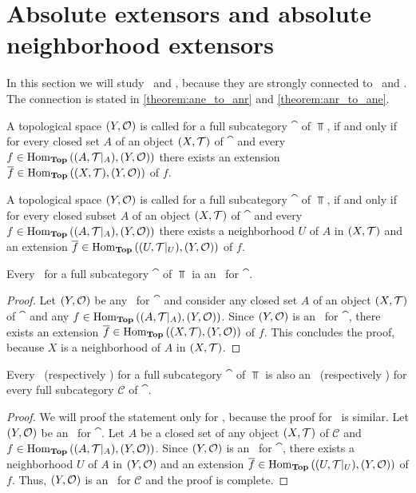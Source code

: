 \chapter{Absolute extensors and absolute neighborhood extensors}

In this section we will study \aexs\ and \anes, because they are strongly connected to \ars\ and \anrs. The connection is stated in \ref{theorem:ane_to_anr} and \ref{theorem:anr_to_ane}. 

\begin{definition}
	A topological space $\tspace[Y][O]$ is called \textit{\aex} for a full subcategory $\cat$ of $\Top$, if and only if for every closed set $A$ of an object $\tspace$ of $\cat$ and every $f \in \Hom_\Top\pbraces{\reltspace, \tspace[Y][O]}$ there exists an extension $\overline{f} \in \Hom_\Top\pbraces{\tspace, \tspace[Y][O]}$ of $f$.  
\end{definition}

\begin{definition}
	A topological space $\tspace[Y][O]$ is called \textit{\ane} for a full subcategory $\cat$ of $\Top$, if and only if for every closed subset $A$ of an object $\tspace$ of $\cat$ and every $f \in \Hom_\Top\pbraces{\reltspace, \tspace[Y][O]}$ there exists a neighborhood $U$ of $A$ in $\tspace$ and an extension $\overline{f} \in \Hom_\Top\pbraces{\reltspace[U], \tspace[Y][O]}$ of $f$.
\end{definition}

\begin{proposition}
	Every \aex\ for a full subcategory $\cat$ of $\Top$ ia an \ane\ for $\cat$. 
\end{proposition}
\begin{proof}
	Let $\tspace[Y][O]$ be any \aex\ for $\cat$ and consider any closed set $A$ of an object $\tspace$ of $\cat$ and any $f \in \Hom_\Top\pbraces{\reltspace, \tspace[Y][O]}$. Since $\tspace[Y][O]$ is an \aex\ for $\cat$, there exists an extension $\overline{f} \in \Hom_\Top\pbraces{\tspace, \tspace[Y][O]}$ of $f$. This concludes the proof, because $X$ is a neighborhood of $A$ in $\tspace$. 
\end{proof}

\begin{proposition}
	Every \aex\ (respectively \ane) for a full subcategory $\cat$ of $\Top$ is also an \aex\ (respectively \ane) for every full subcategory $\mathcal{C}$ of $\cat$. 
\end{proposition}
\begin{proof}
	We will proof the statement only for \anes, because the proof for \aexs\ is similar. Let $\tspace[Y][O]$ be an \ane\ for $\cat$. Let $A$ be a closed set of any object $\tspace$ of $\mathcal{C}$ and $f \in \Hom_\Top\pbraces{\reltspace, \tspace[Y][O]}$. Since $\tspace[Y][O]$ is an \ane\ for $\cat$, there exists a neighborhood $U$ of $A$ in $\tspace[Y][O]$ and an extension $\overline{f} \in \Hom_\Top\pbraces{\reltspace[U], \tspace[Y][O]}$ of $f$. Thus, $\tspace[Y][O]$ is an \ane\ for $\mathcal{C}$ and the proof is complete.
\end{proof}

